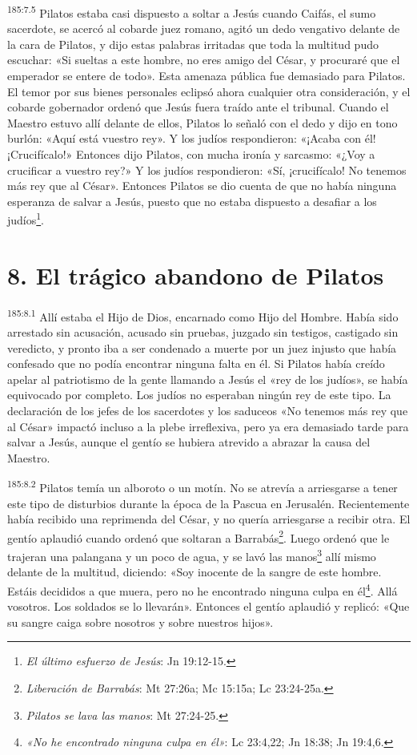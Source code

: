\par 
\textsuperscript{185:7.5} Pilatos estaba casi dispuesto a soltar a Jesús cuando Caifás, el sumo sacerdote, se acercó al cobarde juez romano, agitó un dedo vengativo delante de la cara de Pilatos, y dijo estas palabras irritadas que toda la multitud pudo escuchar: «Si sueltas a este hombre, no eres amigo del César, y procuraré que el emperador se entere de todo». Esta amenaza pública fue demasiado para Pilatos. El temor por sus bienes personales eclipsó ahora cualquier otra consideración, y el cobarde gobernador ordenó que Jesús fuera traído ante el tribunal. Cuando el Maestro estuvo allí delante de ellos, Pilatos lo señaló con el dedo y dijo en tono burlón: «Aquí está vuestro rey». Y los judíos respondieron: «¡Acaba con él! ¡Crucifícalo!» Entonces dijo Pilatos, con mucha ironía y sarcasmo: «¿Voy a crucificar a vuestro rey?» Y los judíos respondieron: «Sí, ¡crucifícalo! No tenemos más rey que al César». Entonces Pilatos se dio cuenta de que no había ninguna esperanza de salvar a Jesús, puesto que no estaba dispuesto a desafiar a los judíos\footnote{\textit{El último esfuerzo de Jesús}: Jn 19:12-15.}.

\section*{8. El trágico abandono de Pilatos}
\par 
\textsuperscript{185:8.1} Allí estaba el Hijo de Dios, encarnado como Hijo del Hombre. Había sido arrestado sin acusación, acusado sin pruebas, juzgado sin testigos, castigado sin veredicto, y pronto iba a ser condenado a muerte por un juez injusto que había confesado que no podía encontrar ninguna falta en él. Si Pilatos había creído apelar al patriotismo de la gente llamando a Jesús el «rey de los judíos», se había equivocado por completo. Los judíos no esperaban ningún rey de este tipo. La declaración de los jefes de los sacerdotes y los saduceos «No tenemos más rey que al César» impactó incluso a la plebe irreflexiva, pero ya era demasiado tarde para salvar a Jesús, aunque el gentío se hubiera atrevido a abrazar la causa del Maestro.

\par 
\textsuperscript{185:8.2} Pilatos temía un alboroto o un motín. No se atrevía a arriesgarse a tener este tipo de disturbios durante la época de la Pascua en Jerusalén. Recientemente había recibido una reprimenda del César, y no quería arriesgarse a recibir otra. El gentío aplaudió cuando ordenó que soltaran a Barrabás\footnote{\textit{Liberación de Barrabás}: Mt 27:26a; Mc 15:15a; Lc 23:24-25a.}. Luego ordenó que le trajeran una palangana y un poco de agua, y se lavó las manos\footnote{\textit{Pilatos se lava las manos}: Mt 27:24-25.} allí mismo delante de la multitud, diciendo: «Soy inocente de la sangre de este hombre. Estáis decididos a que muera, pero no he encontrado ninguna culpa en él\footnote{\textit{«No he encontrado ninguna culpa en él»}: Lc 23:4,22; Jn 18:38; Jn 19:4,6.}. Allá vosotros. Los soldados se lo llevarán». Entonces el gentío aplaudió y replicó: «Que su sangre caiga sobre nosotros y sobre nuestros hijos».